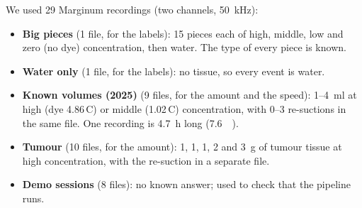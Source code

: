 \label{sec:recordings}
We used 29 Marginum recordings (two channels, \SI{50}{\kilo\hertz}):
\begin{itemize}
  \setlength{\itemsep}{0pt}\setlength{\parskip}{0pt}
  \item \textbf{Big pieces} (1 file, for the labels): 15 pieces each of high, middle, low and
        zero (no dye) concentration, then water. The type of every piece is known.
  \item \textbf{Water only} (1 file, for the labels): no tissue, so every event is water.
  \item \textbf{Known volumes (2025)} (9 files, for the amount and the speed):
        1--\SI{4}{\milli\litre} at high (dye 4.86\,C) or middle (1.02\,C) concentration, with
        0--3 re-suctions in the same file. One recording is \SI{4.7}{\hour} long
        (\SI{7.6}{\giga\byte}).
  \item \textbf{Tumour} (10 files, for the amount): 1, 1, 1, 2 and \SI{3}{\gram} of tumour tissue
        at high concentration, with the re-suction in a separate file.
  \item \textbf{Demo sessions} (8 files): no known answer; used to check that the pipeline runs.
\end{itemize}
